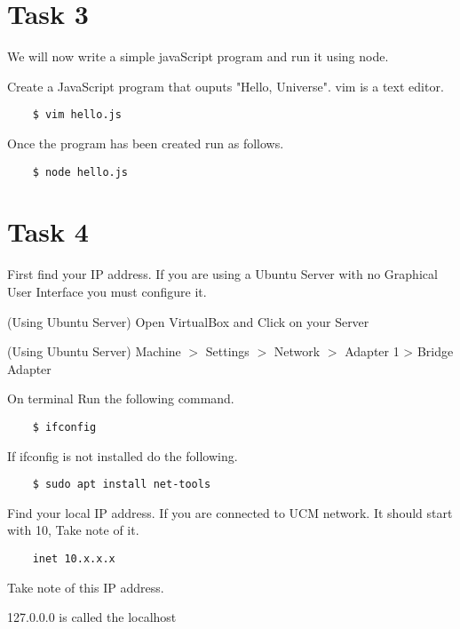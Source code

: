 \documentclass[12pt]{article}
\begin{document}
\section*{Task 3}
We will now write a simple javaScript program and run it using node. 
\begin{todolist}
    \item Create a JavaScript program that ouputs "Hello, Universe". vim is a text editor.  
    \begin{lstlisting}
    $ vim hello.js 
    \end{lstlisting} 
    \item Once the program has been created run as follows. 
    \begin{lstlisting}
    $ node hello.js
    \end{lstlisting}
\end{todolist}
\section*{Task 4}
 First find your IP address. If you are using a Ubuntu Server with no Graphical User Interface you must configure it. 
\begin{todolist}
    \item (Using Ubuntu Server) Open VirtualBox and Click on your Server 
    \item (Using Ubuntu Server) Machine $>$ Settings $>$ Network $>$ Adapter 1 > Bridge Adapter
    \item On terminal Run the following command. 
    \begin{lstlisting}
    $ ifconfig 
    \end{lstlisting}
    \item If ifconfig is not installed do the following. 
    \begin{lstlisting}
    $ sudo apt install net-tools
    \end{lstlisting}
    \item Find your local IP address. If you are connected to UCM network. It should start with 10, Take note of it. 
    \begin{lstlisting}
    inet 10.x.x.x
    \end{lstlisting} 
    \item Take note of this IP address. 
    \item 127.0.0.0 is called the localhost 
    
\end{todolist}
\end{document}
